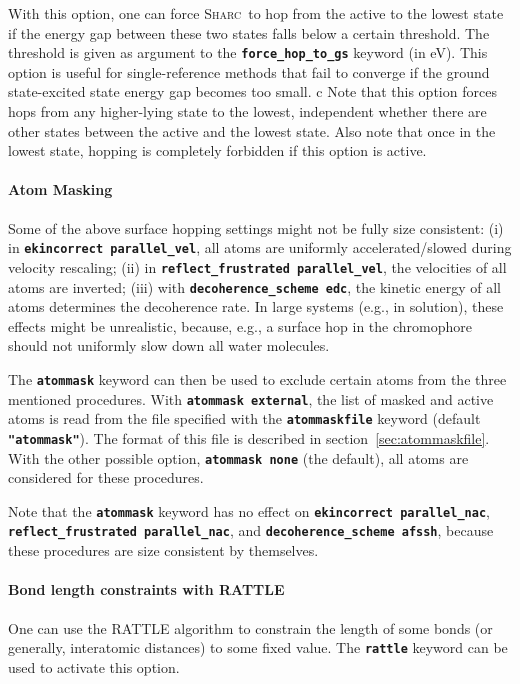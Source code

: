 \documentclass[a4paper,10pt,DIV=15,openany]{scrbook}
\newcommand{\sharc}{\textsc{Sharc}}
\newcommand{\ttt}[1]{\textbf{\texttt{#1}}}
\begin{document}
With this option, one can force \sharc\ to hop from the active to the lowest state if the energy gap between these two states falls below a certain threshold. 
The threshold is given as argument to the \ttt{force\_hop\_to\_gs} keyword (in eV).
This option is useful for single-reference methods that fail to converge if the ground state-excited state energy gap becomes too small.
c
Note that this option forces hops from any higher-lying state to the lowest, independent whether there are other states between the active and the lowest state.
Also note that once in the lowest state, hopping is completely forbidden if this option is active.

\paragraph{Atom Masking}

Some of the above surface hopping settings might not be fully size consistent: (i) in \ttt{ekincorrect parallel\_vel}, all atoms are uniformly accelerated/slowed during velocity rescaling; (ii) in \ttt{reflect\_frustrated parallel\_vel}, the velocities of all atoms are inverted; (iii) with \ttt{decoherence\_scheme edc}, the kinetic energy of all atoms determines the decoherence rate. In large systems (e.g., in solution), these effects might be unrealistic, because, e.g., a surface hop in the chromophore should not uniformly slow down all water molecules.

The \ttt{atommask} keyword can then be used to exclude certain atoms from the three mentioned procedures. With \ttt{atommask external}, the list of masked and active atoms is read from the file specified with the \ttt{atommaskfile} keyword (default \ttt{"atommask"}). The format of this file is described in section~\ref{sec:atommaskfile}. With the other possible option, \ttt{atommask none} (the default), all atoms are considered for these procedures.

Note that the \ttt{atommask} keyword has no effect on \ttt{ekincorrect parallel\_nac}, \ttt{reflect\_frustrated parallel\_nac}, and \ttt{decoherence\_scheme afssh}, because these procedures are size consistent by themselves.

\paragraph{Bond length constraints with RATTLE}

One can use the RATTLE algorithm to constrain the length of some bonds (or generally, interatomic distances) to some fixed value.
The \ttt{rattle} keyword can be used to activate this option.
\end{document}
